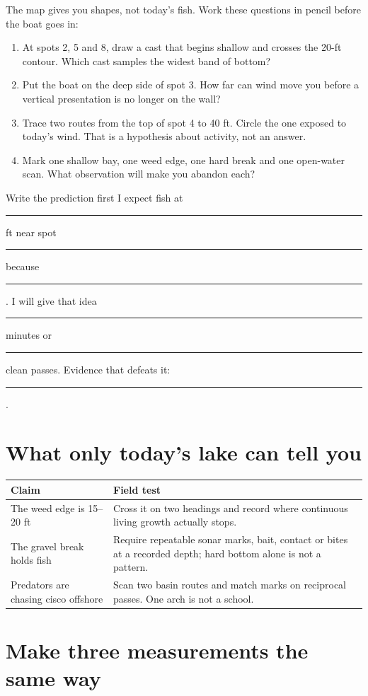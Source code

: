 The map gives you shapes, not today's fish. Work these questions in pencil
before the boat goes in:
\begin{enumerate}
\item At spots 2, 5 and 8, draw a cast that begins shallow and crosses the
20-ft contour. Which cast samples the widest band of bottom?
\item Put the boat on the deep side of spot 3. How far can wind move you before
a vertical presentation is no longer on the wall?
\item Trace two routes from the top of spot 4 to 40 ft. Circle the one exposed
to today's wind. That is a hypothesis about activity, not an answer.
\item Mark one shallow bay, one weed edge, one hard break and one open-water
scan. What observation will make you abandon each?
\end{enumerate}

\begin{teloscard}{Write the prediction first}
I expect fish at \rule{1.25in}{.4pt} ft near spot \rule{.38in}{.4pt} because
\rule{2.4in}{.4pt}. I will give that idea \rule{.5in}{.4pt} minutes or
\rule{.5in}{.4pt} clean passes. Evidence that defeats it:
\rule{2.25in}{.4pt}.
\end{teloscard}

\section{What only today's lake can tell you}
\begin{tabularx}{\linewidth}{@{}p{.31\linewidth}X@{}}
\toprule
\textbf{Claim} & \textbf{Field test}\\
\midrule
The weed edge is 15--20 ft & Cross it on two headings and record where
continuous living growth actually stops.\\
The gravel break holds fish & Require repeatable sonar marks, bait, contact or
bites at a recorded depth; hard bottom alone is not a pattern.\\
Predators are chasing cisco offshore & Scan two basin routes and match marks
on reciprocal passes. One arch is not a school.\\
\bottomrule
\end{tabularx}

\newpage
\section{Make three measurements the same way}

